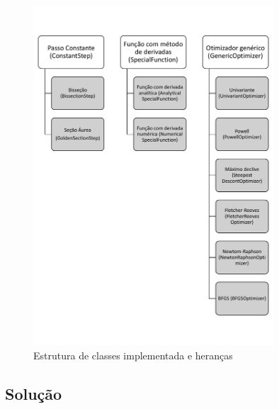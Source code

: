 \documentclass[10pt, a4paper]{article}
\begin{document}
\begin{figure}[htpb]
  \centering
  \includegraphics[width=0.8\textwidth]{../general/classes_full.pdf}
  \caption{Estrutura de classes implementada e heranças}
  \label{fig:q1_1}
\end{figure}

\lipsum[1-2]

\subsection{Solução}

\lipsum[1-2]
\end{document}

